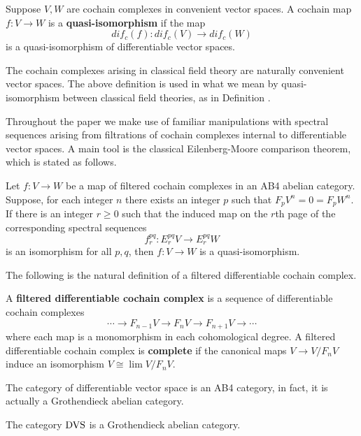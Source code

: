 \documentclass[10pt, oneside]{article}
\begin{document}
\begin{definition}
Suppose $V,W$ are cochain complexes in convenient vector spaces. 
A cochain map $f : V \to W$ is a {\bf quasi-isomorphism} if the map
\[
dif_c (f) : dif_c(V) \to dif_c(W)
\]
is a quasi-isomorphism of differentiable vector spaces.
\end{definition}

The cochain complexes arising in classical field theory are naturally convenient vector spaces. 
The above definition is used in what we mean by quasi-isomorphism between classical field theories, as in Definition .

Throughout the paper we make use of familiar manipulations with spectral sequences arising from filtrations of cochain complexes internal to differentiable vector spaces. 
A main tool is the classical Eilenberg-Moore comparison theorem, which is stated as follows.

\begin{thm}
Let $f : V \to W$ be a map of filtered cochain complexes in an AB4 abelian category.
Suppose, for each integer $n$ there exists an integer $p$ such that $F_p V^n = 0 = F_p W^n$.
If there is an integer $r \geq 0$ such that the induced map on the $r$th page of the corresponding spectral sequences 
\[
f_r^{pq} :  E_r^{pq} V \to E_r^{pq} W
\]
is an isomorphism for all $p,q$, then $f : V \to W$ is a quasi-isomorphism. 
\end{thm}

The following is the natural definition of a filtered differentiable cochain complex. 

\begin{definition}
A {\bf filtered differentiable cochain complex} is a sequence of differentiable cochain complexes
\[
\cdots \to F_{n-1} V \to F_{n} V \to F_{n+1}V \to \cdots
\]
where each map is a monomorphism in each cohomological degree. 
A filtered differentiable cochain complex is {\bf complete} if the canonical maps $V \to V / F_n V$ induce an isomorphism $V \cong \lim V / F_n V$. 
\end{definition}

The category of differentiable vector space is an AB4 category, in fact, it is actually a Grothendieck abelian category. 

\begin{thm}
The category ${\rm DVS}$ is a Grothendieck abelian category.
\end{thm}
\end{document}

